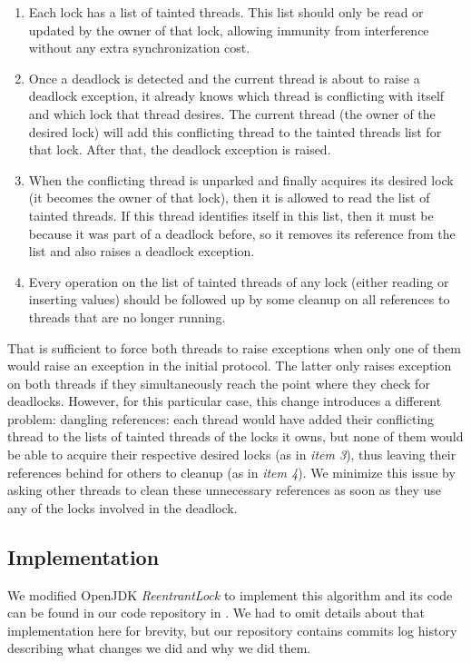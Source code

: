 \begin{enumerate}
\item Each lock has a list of tainted threads. This list should only be read or updated by the owner of that lock, allowing immunity from interference without any extra synchronization cost.
\item Once a deadlock is detected and the current thread is about to raise a deadlock exception, it already knows which thread is conflicting with itself and which lock that thread desires. The current thread (the owner of the desired lock) will add this conflicting thread to the tainted threads list for that lock. After that, the deadlock exception is raised.
\item When the conflicting thread is unparked and finally acquires its desired lock (it becomes the owner of that lock), then it is allowed to read the list of tainted threads. If this thread identifies itself in this list, then it must be because it was part of a deadlock before, so it removes its reference from the list and also raises a deadlock exception.
\item Every operation on the list of tainted threads of any lock (either reading or inserting values) should be followed up by some cleanup on all references to threads that are no longer running.
\end{enumerate}

That is sufficient to force both threads to raise exceptions when only one of them would raise an exception in the initial protocol. The latter only raises exception on both threads if they simultaneously reach the point where they check for deadlocks. However, for this particular case, this change introduces a different problem: dangling references:
each thread would have added their conflicting thread to the lists of tainted threads of the locks it owns, 
but none of them would be able to acquire their respective desired locks (as in \emph{item 3}),
thus leaving their references behind for others to cleanup (as in \emph{item 4}). We minimize this issue by asking other threads to clean these unnecessary references as soon as they use any of the locks involved in the deadlock.

\subsection{Implementation}

We modified OpenJDK \emph{ReentrantLock} to implement this algorithm and its code can be found in our code repository in \cite{repo}. We had to omit details about that implementation here for brevity, but our repository contains commits log history describing what changes we did and why we did them.

